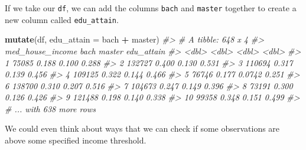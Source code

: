 \documentclass[
]{book}
\newenvironment{Shaded}{\begin{snugshade}}{\end{snugshade}}
\newcommand{\CommentTok}[1]{\textcolor[rgb]{0.56,0.35,0.01}{\textit{#1}}}
\newcommand{\DataTypeTok}[1]{\textcolor[rgb]{0.13,0.29,0.53}{#1}}
\newcommand{\KeywordTok}[1]{\textcolor[rgb]{0.13,0.29,0.53}{\textbf{#1}}}
\newcommand{\NormalTok}[1]{#1}
\newcommand{\OperatorTok}[1]{\textcolor[rgb]{0.81,0.36,0.00}{\textbf{#1}}}
\newcommand{\StringTok}[1]{\textcolor[rgb]{0.31,0.60,0.02}{#1}}
\begin{document}
If we take our \texttt{df}, we can add the columns \texttt{bach} and \texttt{master} together to create a new column called \texttt{edu\_attain}.

\begin{Shaded}
\begin{Highlighting}[]
\KeywordTok{mutate}\NormalTok{(df, }\DataTypeTok{edu\_attain =}\NormalTok{ bach }\OperatorTok{+}\StringTok{ }\NormalTok{master)}
\CommentTok{\#\textgreater{} \# A tibble: 648 x 4}
\CommentTok{\#\textgreater{}    med\_house\_income  bach master edu\_attain}
\CommentTok{\#\textgreater{}               \textless{}dbl\textgreater{} \textless{}dbl\textgreater{}  \textless{}dbl\textgreater{}      \textless{}dbl\textgreater{}}
\CommentTok{\#\textgreater{}  1            75085 0.188 0.100       0.288}
\CommentTok{\#\textgreater{}  2           132727 0.400 0.130       0.531}
\CommentTok{\#\textgreater{}  3           110694 0.317 0.139       0.456}
\CommentTok{\#\textgreater{}  4           109125 0.322 0.144       0.466}
\CommentTok{\#\textgreater{}  5            76746 0.177 0.0742      0.251}
\CommentTok{\#\textgreater{}  6           138700 0.310 0.207       0.516}
\CommentTok{\#\textgreater{}  7           104673 0.247 0.149       0.396}
\CommentTok{\#\textgreater{}  8            73191 0.300 0.126       0.426}
\CommentTok{\#\textgreater{}  9           121488 0.198 0.140       0.338}
\CommentTok{\#\textgreater{} 10            99358 0.348 0.151       0.499}
\CommentTok{\#\textgreater{} \# ... with 638 more rows}
\end{Highlighting}
\end{Shaded}

We could even think about ways that we can check if some observations are above some specified income threshold.
\end{document}
